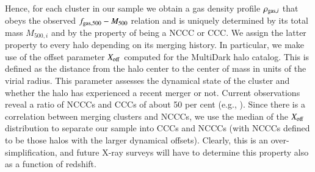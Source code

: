 \documentclass[useAMS,usenatbib]{mn2e}
\begin{document}
Hence, for each cluster in our sample we obtain a gas density profile
$\rho_{{\mathrm{gas}},i}$ that obeys the observed $f_{{\mathrm{gas}},500}-M_{500}$ relation and
is uniquely determined by its total mass $M_{500,i}$ and by the property of being a
NCCC or CCC. We assign the latter property to every halo depending on its
merging history. In particular, we make use of the offset parameter
$X_{{\mathrm{off}}}$ computed for the MultiDark halo catalog. This is defined as the
distance from the halo center to the center of mass in units of the virial
radius. This parameter assesses the dynamical state of the cluster and whether
the halo has experienced a recent merger or not. Current observations reveal a ratio
of NCCCs and CCCs of about 50 per cent (e.g., \citealp{2007A&A...466..805C,
  2009MNRAS.395..764S}). Since there is a correlation between merging clusters
and NCCCs, we use the median of the $X_{{\mathrm{off}}}$ distribution to separate our
sample into CCCs and NCCCs (with NCCCs defined to be those halos with the larger
dynamical offsets). Clearly, this is an over-simplification, and future X-ray
surveys will have to determine this property also as a function of redshift.
\end{document}
